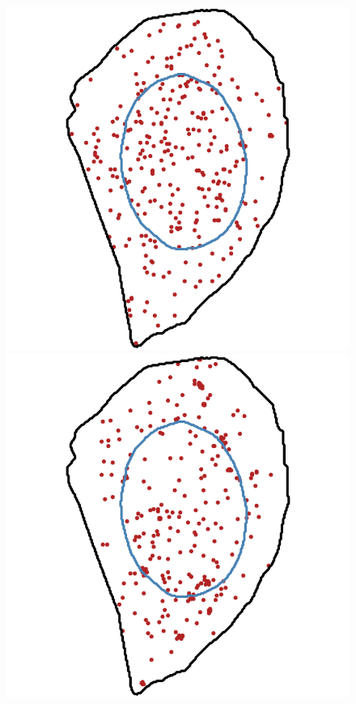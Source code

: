 \begin{figure}[]
	\centering
		\includegraphics[width=\linewidth]{figures/chapter4/simulation_foci_10}
	\endminipage\hfill
		\includegraphics[width=\linewidth]{figures/chapter4/simulation_foci_50}

\end{figure}
